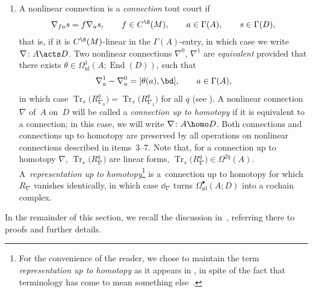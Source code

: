 \begin{enumerate}
\begin{gather*}
 \phi_*(T_xN) + \varrho_A(A_{\phi(x)}) = T_{\phi(x)}M, \qquad x \in N,
\end{gather*}then there is a \emph{pullback Lie algebroid} $\phi^!(A):=TN \times_{TM}A$ on $N$, and an induced \emph{pullback morphism} of Lie algebroids $\big(\widetilde{\phi},\phi\big)\colon \phi^!(A) \to A$. In this case, we will write simply~$\phi^!\nabla$ and~$\phi^*$ instead of $\big(\widetilde{\phi},\phi\big)^!\nabla$ and $\big(\widetilde{\phi},\phi\big)^*$.
\item A nonlinear connection is a \emph{connection} tout court if
\begin{gather*}
 \nabla_{fa}s = f\nabla_as, \qquad f \in C^{\8}(M), \qquad a \in \Gamma(A), \qquad s \in \Gamma(D),
\end{gather*}that is, if it is $C^{\8}(M)$-linear in the $\Gamma(A)$-entry, in which case we write $\nabla\colon A \acts D$. Two nonlinear connections $\nabla^0$, $\nabla^1$ are \emph{equivalent} provided that there exists $\theta \in \Omega_{\mathrm{nl}}^1(A;\operatorname{End}(D))$, such that
\begin{gather*}
 \nabla^1_a -\nabla^0_a = [\theta(a),\bd], \qquad a \in \Gamma(A),
\end{gather*}in which case $\operatorname{Tr}_s\big(R_{\nabla_0}^q\big)=\operatorname{Tr}_s\big(R_{\nabla_1}^q\big)$ for all $q$ (see \cite{CrFer_Char}). A nonlinear connection~$\nabla$ of~$A$ on~$D$ will be called a \emph{connection up to homotopy} if it is equivalent to a connection; in this case, we will write $\nabla\colon A \homo D$. Both connections and connections up to homotopy are preserved by all operations on nonlinear connections described in items~3--7. Note that, for a connection up to homotopy $\nabla$, $\operatorname{Tr}_s\big(R_{\nabla}^q\big)$ are linear forms, $\operatorname{Tr}_s\big(R_{\nabla}^q\big) \in \Omega^{2q}(A)$. A~\emph{representation up to homotopy}\footnote{For the convenience of the reader, we chose to maintain the term \emph{representation up to homotopy} as it appears in \cite{CrainicNL,CrFer_Char}, in spite of the fact that terminology has come to mean something else~\cite{AbadCrainic}.} is a~connection up to homotopy for which $R_{\nabla}$ vanishes identically, in which case $\dd_{\nabla}$ turns $\Omega^{\bullet}_{\mathrm{nl}}(A;D)$ into a cochain complex.
\end{enumerate}
In the remainder of this section, we recall the discussion in~\cite{CrFer_Char}, referring there to proofs and further details.

